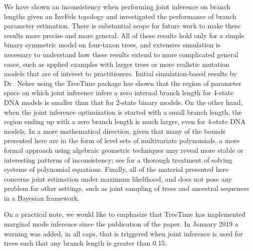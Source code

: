 \documentclass[11pt]{article}
\begin{document}

We have shown an inconsistency when performing joint inference on branch lengths given an InvFels topology and investigated the performance of branch parameter estimation.
There is substantial scope for future work to make these results more precise and more general.
All of these results hold only for a simple binary symmetric model on four-taxon trees, and extensive simulation is necessary to understand how these results extend to more complicated general cases, such as applied examples with larger trees or more realistic mutation models that are of interest to practitioners.
Initial simulation-based results by Dr.\ Neher using the TreeTime \citep{Sagulenko2018-xl} package has shown that the region of parameter space on which joint inference infers a zero internal branch length for 4-state DNA models is smaller than that for 2-state binary models.
On the other hand, when the joint inference optimization is started with a small branch length, the region ending up with a zero branch length is much larger, even for 4-state DNA models.
In a more mathematical direction, given that many of the bounds presented here are in the form of level sets of multivariate polynomials, a more formal approach using algebraic geometric techniques may reveal more stable or interesting patterns of inconsistency; see \citet{Sturmfels2002} for a thorough treatment of solving systems of polynomial equations.
Finally, all of the material presented here concerns joint estimation under maximum likelihood, and does not pose any problem for other settings, such as joint sampling of trees and ancestral sequences in a Bayesian framework.

On a practical note, we would like to emphasize that TreeTime has implemented marginal mode inference since the publication of the \citet{Sagulenko2018-xl} paper.
In January 2019 a warning was added, in all caps, that is triggered when joint inference is used for trees such that any branch length is greater than 0.15.
\end{document}

